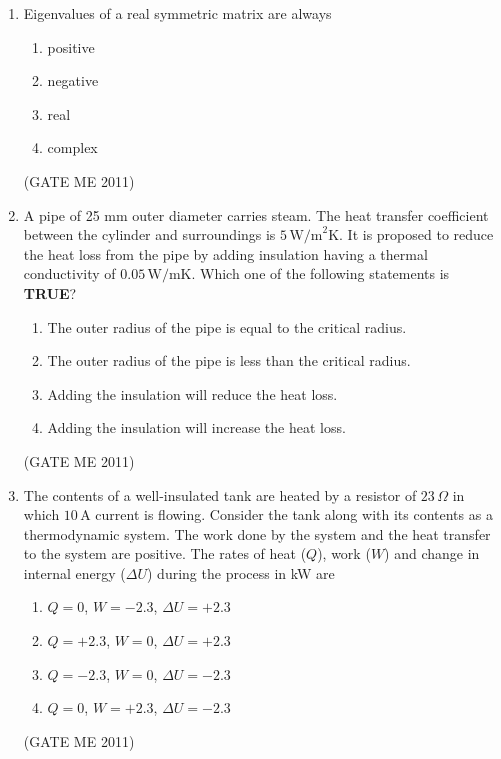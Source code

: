 \documentclass[journal]{IEEEtran}
\begin{document}
\begin{enumerate}
\item Eigenvalues of a real symmetric matrix are always
\begin{multicols}{4}
\begin{enumerate}
\item positive  
\item negative  
\item real  
\item complex  
\end{enumerate}
\end{multicols}    
\hfill (GATE ME 2011)  

\item A pipe of 25 mm outer diameter carries steam. The heat transfer coefficient between the cylinder and surroundings is $5\,\text{W/m}^2\text{K}$. It is proposed to reduce the heat loss from the pipe by adding insulation having a thermal conductivity of $0.05\,\text{W/mK}$. Which one of the following statements is \textbf{TRUE}?
\begin{enumerate}
\item The outer radius of the pipe is equal to the critical radius.  
\item The outer radius of the pipe is less than the critical radius.  
\item Adding the insulation will reduce the heat loss.  
\item Adding the insulation will increase the heat loss.  
\end{enumerate}
\hfill (GATE ME 2011)

\item The contents of a well-insulated tank are heated by a resistor of $23\,\Omega$ in which $10\,\text{A}$ current is flowing. Consider the tank along with its contents as a thermodynamic system. The work done by the system and the heat transfer to the system are positive. The rates of heat ($Q$), work ($W$) and change in internal energy ($\Delta U$) during the process in kW are
\begin{multicols}{2}
\begin{enumerate}
\item $Q = 0$, $W = -2.3$, $\Delta U = +2.3$  
\item $Q = +2.3$, $W = 0$, $\Delta U = +2.3$  
\item $Q = -2.3$, $W = 0$, $\Delta U = -2.3$  
\item $Q = 0$, $W = +2.3$, $\Delta U = -2.3$  
\end{enumerate}
\end{multicols}   
\hfill (GATE ME 2011)  


\end{enumerate}
\end{document}
